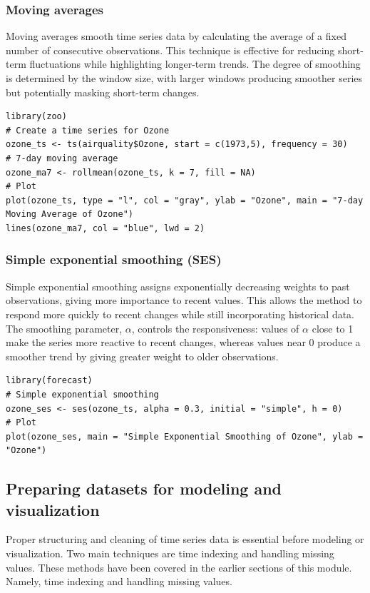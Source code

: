 \documentclass[12pt,a4paper]{article}
\begin{document}
\subsubsection{Moving averages}

Moving averages smooth time series data by calculating the average of a fixed number of consecutive observations. This technique is effective for reducing short-term fluctuations while highlighting longer-term trends. The degree of smoothing is determined by the window size, with larger windows producing smoother series but potentially masking short-term changes.

\begin{verbatim}
library(zoo)
# Create a time series for Ozone
ozone_ts <- ts(airquality$Ozone, start = c(1973,5), frequency = 30)
# 7-day moving average
ozone_ma7 <- rollmean(ozone_ts, k = 7, fill = NA)
# Plot
plot(ozone_ts, type = "l", col = "gray", ylab = "Ozone", main = "7-day Moving Average of Ozone")
lines(ozone_ma7, col = "blue", lwd = 2)
\end{verbatim}

\subsubsection{Simple exponential smoothing (SES)}

Simple exponential smoothing assigns exponentially decreasing weights to past observations, giving more importance to recent values. This allows the method to respond more quickly to recent changes while still incorporating historical data. The smoothing parameter, \(\alpha\), controls the responsiveness: values of \(\alpha\) close to 1 make the series more reactive to recent changes, whereas values near 0 produce a smoother trend by giving greater weight to older observations.

\begin{verbatim}
library(forecast)
# Simple exponential smoothing
ozone_ses <- ses(ozone_ts, alpha = 0.3, initial = "simple", h = 0)
# Plot
plot(ozone_ses, main = "Simple Exponential Smoothing of Ozone", ylab = "Ozone")
\end{verbatim}

\subsection{Preparing datasets for modeling and visualization}

Proper structuring and cleaning of time series data is essential before modeling or visualization. Two main techniques are time indexing and handling missing values. These methods have been covered in the earlier sections of this module. Namely, time indexing and handling missing values.
\end{document}
